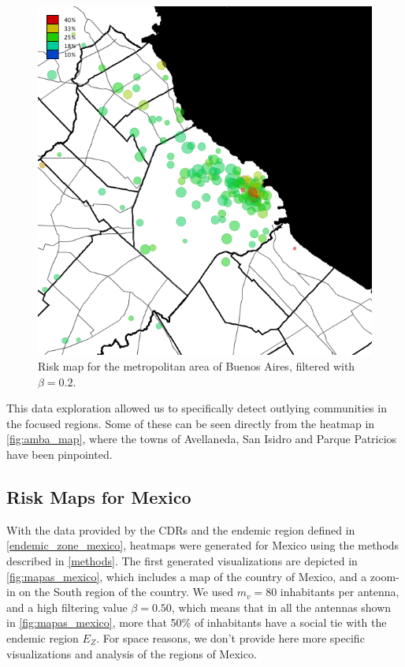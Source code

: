 \begin{figure}[h!]
	\caption{Risk map for the metropolitan area of Buenos Aires, filtered with $\beta = 0.2$.}
	\label{fig:amba_map_beta20}
	\begin{center}
		\includegraphics[width=0.35\columnwidth]{figures/201112_hi_res_amba_usuarios_proporcion_circulos_beta20/201112_hi_res_amba_usuarios_proporcion_circulos_beta20}

	\end{center}
\end{figure}

This data exploration allowed us to specifically detect outlying communities in the focused regions. Some of these can be seen directly from the heatmap in \cref{fig:amba_map}, where the towns of Avellaneda, San Isidro and Parque Patricios have been pinpointed.


\newpage

\subsection{Risk Maps for Mexico}

With the data provided by the CDRs and the endemic region defined in \cref{endemic_zone_mexico}, heatmaps were generated for Mexico using the methods described in \cref{methods}. The first generated visualizations are depicted in \cref{fig:mapas_mexico},
which includes a map of the country of Mexico, and a zoom-in on the South region of the country.
We used $m_v = 80$ inhabitants per antenna, and a high filtering value $\beta = 0.50$, which
means that in all the antennas shown in \cref{fig:mapas_mexico},
more that 50\% of inhabitants have a social tie with the endemic region $E_Z$.
For space reasons, we don't provide here more specific visualizations and analysis of the regions of Mexico.

